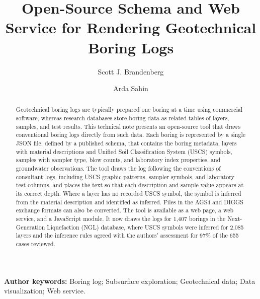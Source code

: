 \documentclass[Journal,letterpaper,InsideFigs]{ascelike-new}
\begin{document}
\title{Open-Source Schema and Web Service for Rendering Geotechnical Boring Logs}

\author[1]{Scott J. Brandenberg}
\author[2]{Arda Sahin}


\maketitle

\begin{abstract}
Geotechnical boring logs are typically prepared one boring at a time using commercial software, whereas research databases store boring data as related tables of layers, samples, and test results. This technical note presents an open-source tool that draws conventional boring logs directly from such data. Each boring is represented by a single JSON file, defined by a published schema, that contains the boring metadata, layers with material descriptions and Unified Soil Classification System (USCS) symbols, samples with sampler type, blow counts, and laboratory index properties, and groundwater observations. The tool draws the log following the conventions of consultant logs, including USCS graphic patterns, sampler symbols, and laboratory test columns, and places the text so that each description and sample value appears at its correct depth. Where a layer has no recorded USCS symbol, the symbol is inferred from the material description and identified as inferred. Files in the AGS4 and DIGGS exchange formats can also be converted.  The tool is available as a web page, a web service, and a JavaScript module. It now draws the logs for 1,407 borings in the Next-Generation Liquefaction (NGL) database, where USCS symbols were inferred for 2,085 layers and the inference rules agreed with the authors' assessment for 97\% of the 655 cases reviewed.
\end{abstract}

\noindent\textbf{Author keywords:} Boring log; Subsurface exploration; Geotechnical data; Data visualization; Web service.
\end{document}

